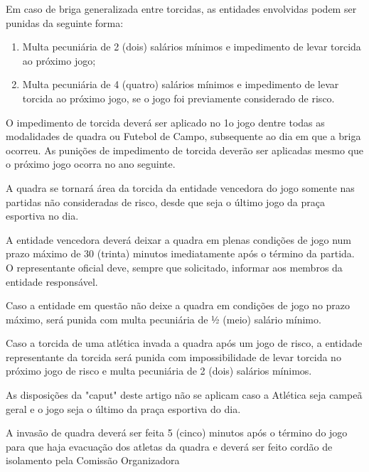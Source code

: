 \begin{article}
	Em caso de briga generalizada entre torcidas, as entidades envolvidas podem ser punidas da seguinte forma:

	\begin{enumerate}[noitemsep]
		\item Multa pecuniária de 2 (dois) salários mínimos e impedimento de levar torcida ao próximo jogo;
		\item Multa pecuniária de 4 (quatro) salários mínimos e impedimento de levar torcida ao próximo jogo, se o jogo foi previamente considerado de risco.
	\end{enumerate}

	\begin{xparagraph}
		O impedimento de torcida deverá ser aplicado no 1o jogo dentre todas as modalidades de quadra ou Futebol de Campo, subsequente ao dia em que a briga ocorreu. As punições de impedimento de torcida deverão ser aplicadas mesmo que o próximo jogo ocorra no ano seguinte.
	\end{xparagraph}
\end{article}

\begin{article}
	A quadra se tornará área da torcida da entidade vencedora do jogo somente nas partidas não consideradas de risco, desde que seja o último jogo da praça esportiva no dia.

	\begin{xparagraph}
		A entidade vencedora deverá deixar a quadra em plenas condições de jogo num prazo máximo de 30 (trinta) minutos imediatamente após o término da partida. O representante oficial deve, sempre que solicitado, informar aos membros da entidade responsável.
	\end{xparagraph}

	\begin{xparagraph}
		Caso a entidade em questão não deixe a quadra em condições de jogo no prazo máximo, será punida com multa pecuniária de 1⁄2 (meio) salário mínimo.
	\end{xparagraph}
\end{article}

\begin{article}
	Caso a torcida de uma atlética invada a quadra após um jogo de risco, a entidade representante da torcida será punida com impossibilidade de levar torcida no próximo jogo de risco e multa pecuniária de 2 (dois) salários mínimos.

	\begin{xparagraph}
		As disposições da "caput" deste artigo não se aplicam caso a Atlética seja campeã geral e o jogo seja o último da praça esportiva do dia.
	\end{xparagraph}

	\begin{xparagraph}
		A invasão de quadra deverá ser feita 5 (cinco) minutos após o término do jogo para que haja evacuação dos atletas da quadra e deverá ser feito cordão de isolamento pela Comissão Organizadora
	\end{xparagraph}
\end{article}

